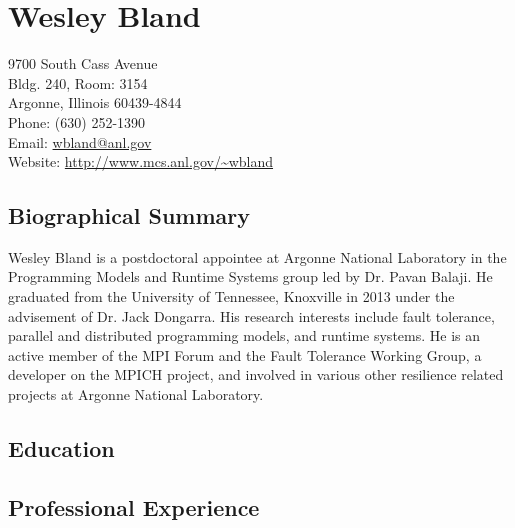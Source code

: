 \documentclass{article}
\def \mywebsite {http://www.mcs.anl.gov/~wbland}
\begin{document}
\section*{Wesley Bland}
    9700 South Cass Avenue\\
    Bldg. 240, Room: 3154 \\
    Argonne, Illinois 60439-4844\\
    Phone: (630) 252-1390\\
    Email: \href{mailto:wbland@anl.gov}{wbland@anl.gov}\\
    Website: \url{\mywebsite}

\subsection*{Biographical Summary}
Wesley Bland is a postdoctoral appointee at Argonne National Laboratory in the
Programming Models and Runtime Systems group led by Dr. Pavan Balaji. He
graduated from the University of Tennessee, Knoxville in 2013 under the
advisement of Dr. Jack Dongarra. His research interests include fault
tolerance, parallel and distributed programming models, and runtime systems.
He is an active member of the MPI Forum and the Fault Tolerance Working Group,
a developer on the MPICH project, and involved in various other resilience
related projects at Argonne National Laboratory.


\subsection*{Education} 



\subsection*{Professional Experience} 


\end{document}
